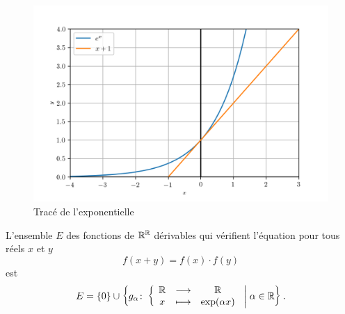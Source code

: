 \begin{figure}
    \centering
    \includegraphics[scale=0.8]{exp.png}
    \caption{Tracé de l'exponentielle}
    \label{fig:traceexp}
\end{figure}
\begin{theo}
    L'ensemble \(E\) des fonctions de \(\mathbb{R}^{\mathbb{R}}\) dérivables qui vérifient 
    l'équation pour tous réels \(x\) et \(y\)
    \begin{equation}
        \label{eq:foncexp}
        f(x+y)=f(x) \cdot f(y)
    \end{equation}
    est
    \begin{equation}
        E=\left\{0\right\} \cup 
        \left\{g_{\alpha}\colon \left\{\begin{array}{ccc} \mathbb{R} & \longrightarrow &\mathbb{R}\\ x & \longmapsto & \exp(\alpha x) \end{array} \right.\mathrel{}\middle|\mathrel{}\alpha \in 
        \mathbb{R}\right\}.
    \end{equation}
\end{theo}
